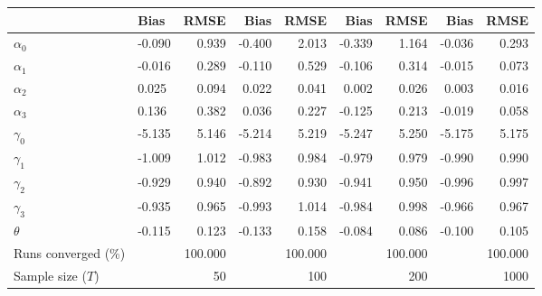 
\begin{tabular}[t]{llrrrrrrr}
\toprule
  & Bias & RMSE & Bias & RMSE & Bias & RMSE & Bias & RMSE\\
\midrule
$\alpha_{0}$ & -0.090 & 0.939 & -0.400 & 2.013 & -0.339 & 1.164 & -0.036 & 0.293\\
$\alpha_{1}$ & -0.016 & 0.289 & -0.110 & 0.529 & -0.106 & 0.314 & -0.015 & 0.073\\
$\alpha_{2}$ & 0.025 & 0.094 & 0.022 & 0.041 & 0.002 & 0.026 & 0.003 & 0.016\\
$\alpha_{3}$ & 0.136 & 0.382 & 0.036 & 0.227 & -0.125 & 0.213 & -0.019 & 0.058\\
$\gamma_{0}$ & -5.135 & 5.146 & -5.214 & 5.219 & -5.247 & 5.250 & -5.175 & 5.175\\
$\gamma_{1}$ & -1.009 & 1.012 & -0.983 & 0.984 & -0.979 & 0.979 & -0.990 & 0.990\\
$\gamma_{2}$ & -0.929 & 0.940 & -0.892 & 0.930 & -0.941 & 0.950 & -0.996 & 0.997\\
$\gamma_{3}$ & -0.935 & 0.965 & -0.993 & 1.014 & -0.984 & 0.998 & -0.966 & 0.967\\
$\theta$ & -0.115 & 0.123 & -0.133 & 0.158 & -0.084 & 0.086 & -0.100 & 0.105\\
Runs converged (\%) &  & 100.000 &  & 100.000 &  & 100.000 &  & 100.000\\
Sample size ($T$) &  & 50 &  & 100 &  & 200 &  & 1000\\
\bottomrule
\end{tabular}
